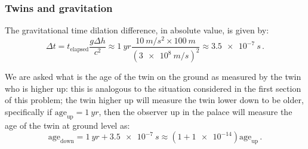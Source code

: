 \documentclass[main.tex]{subfiles}
\begin{document}
\subsubsection{Twins and gravitation}

The gravitational time dilation difference, in absolute value, is given by: 
%
\begin{equation}
  \Delta t = t _{\text{elapsed}} \frac{g \Delta h}{c^2}
  \approx \SI{1}{yr} \frac{\SI{10}{m/s^2} \times \SI{100}{m}}{(\SI{3e8}{m/s})^2} \approx \SI{3.5e-7}{s} 
\,.
\end{equation}

We are asked what is the age of the twin on the ground as measured by the twin who is higher up: this is analogous to the situation considered in the first section of this problem; the twin higher up will measure the twin lower down to be older, specifically if \(\text{age}_{\text{up}} = \SI{1}{yr}\), then the observer up in the palace will measure the age of the twin at ground level as:
%
\begin{equation}
  \text{age}_{\text{down}} = \SI{1}{yr} + \SI{3.5e-7}{s} \approx (1+\num{1e-14}) \text{age}_{\text{up}}
\,.
\end{equation}
%
\end{document}
